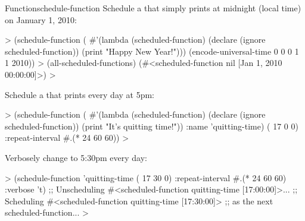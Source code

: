 \begin{functiondoc}{Function}{schedule-function}
%
\fnexamples Schedule a  that simply prints
  at midnight (local time) on January 1, 2010:
%
\W\supp
\begin{example}
  > (schedule-function
      (
        #'(lambda (scheduled-function)
            (declare (ignore scheduled-function))
            (print "Happy New Year!")))
       (encode-universal-time 0 0 0 1 1 2010))
  > (all-scheduled-functions)
  (#<scheduled-function nil [Jan 1, 2010 00:00:00]>)
  >
\end{example}
%
%
%
%
Schedule a  that prints   every day at 5pm:
%
\W\supp\notpretop
\begin{example}
  > (schedule-function
      (
        #'(lambda (scheduled-function)
            (declare (ignore scheduled-function))
            (print "It's quitting time!"))
        :name 'quitting-time)
       ( 17 0 0) :repeat-interval #.(* 24 60 60))
  >
\end{example}
%
%
%
Verbosely change  to 5:30pm every day:
%
\W\supp\notpretop
\begin{example}
  > (schedule-function 'quitting-time ( 17 30 0)
      :repeat-interval #.(* 24 60 60)
      :verbose 't)
  ;; Unscheduling #<scheduled-function quitting-time [17:00:00]>...
  ;; Scheduling #<scheduled-function quitting-time [17:30:00]> 
  ;; as the next scheduled-function...
  >
\end{example}

\end{functiondoc}


